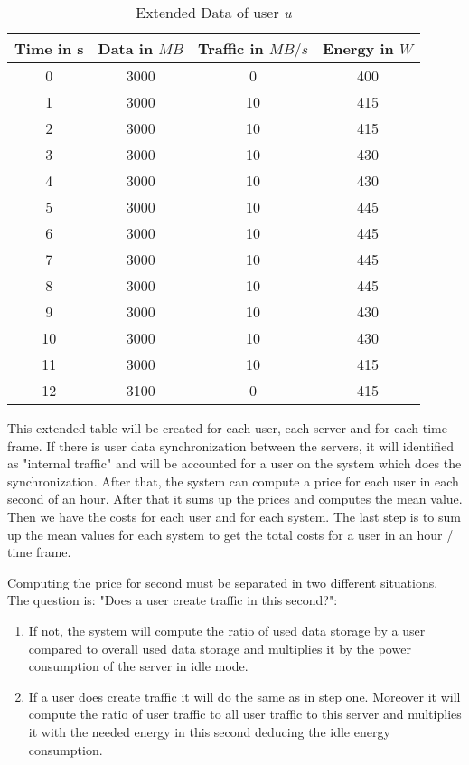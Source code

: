  \begin{table}
 \centering
 \caption{Extended Data of user \textit{u}}
 \begin{tabular}{|c|c|c|c|}
  \hline Time in s & Data in $MB$ & Traffic in $MB/s$ & Energy in $W$ \\ 
   \hline 0 & 3000 & 0 & 400 \\ 
  \hline 1 & 3000 & 10 & 415 \\ 
  \hline 2 & 3000 & 10 & 415 \\ 
  \hline 3 & 3000 & 10 & 430 \\ 
  \hline 4 & 3000 & 10 & 430 \\ 
  \hline 5 & 3000 & 10 & 445 \\
  \hline 6 & 3000 & 10 & 445 \\ 
  \hline 7 & 3000 & 10 & 445 \\ 
  \hline 8 & 3000 & 10 & 445 \\ 
  \hline 9 & 3000 & 10 & 430 \\  
  \hline 10 & 3000 & 10 & 430 \\
   \hline 11 & 3000 & 10 & 415 \\
  \hline 12 & 3100 & 0 & 415 \\  
  \hline 
  \end{tabular}
  \label{tb2} 
  \end{table}
  
  This extended table will be created for each user, each server and for each time frame. If there is user data synchronization between the servers, it will identified as "internal traffic" and will be accounted for a user on the system which does the synchronization. After that, the system can compute a price for each user in each second of an hour. After that it sums up the prices and computes the mean value. Then we have the costs for each user and for each system. The last step is to sum up the mean values for each system to get the total costs for a user in an hour / time frame.
  
  Computing the price for second must be separated in two different situations. The question is: "Does a user create traffic in this second?":
  \begin{enumerate}
	\item
	If not, the system will compute the ratio of used data storage by a user compared to overall used data storage and multiplies it by the power consumption of the server in idle mode.
	\item
	If a user does create traffic it will do the same as in step one. Moreover it will compute the ratio of user traffic to all user traffic to this server and multiplies it with the needed energy in this second deducing the idle energy consumption.
  \end{enumerate}
  
